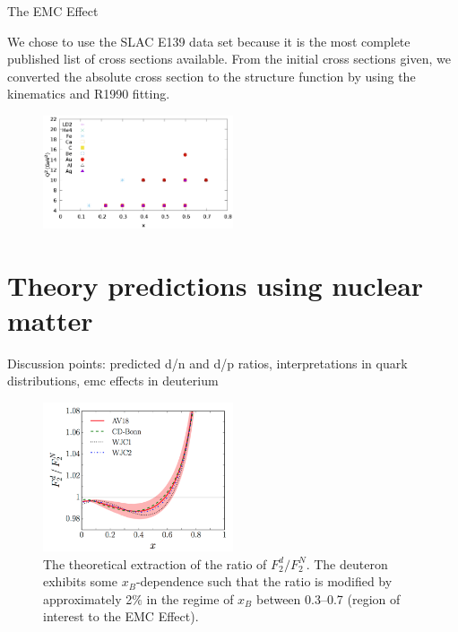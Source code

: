 \documentclass[oneside]{article}
\begin{document}
The EMC Effect



We chose to use the SLAC E139 data set because it is the most complete published list of cross sections available. From the initial cross sections given, we converted the absolute cross section to the structure function by using the kinematics and R1990 fitting. 


\begin{figure}[H]
  \centering
      	  \includegraphics[width=0.5\textwidth]{plots/F2ADdataQ2vsx.eps}
 	 \caption[]{}
  \label{fig:slac_q2x}
 \end{figure} 
 
\section{Theory predictions using nuclear matter}

Discussion points: predicted d/n and d/p ratios, interpretations in quark distributions, emc effects in deuterium


  
\begin{figure}[H]
  \centering
      	  \includegraphics[width=0.5\textwidth]{plots/dn_effects_theory.png}
 	 \caption[Theoretical extraction of the ratio of $F_2^d/F_2^N$]{The theoretical extraction of the ratio of $F_2^d/F_2^N$. The deuteron exhibits some $x_B$-dependence such that the ratio is modified by approximately 2$\%$ in the regime of $x_B$ between 0.3--0.7 (region of interest to the EMC Effect).}
  \label{fig:dn_theory}
 \end{figure}  
 
\end{document}
